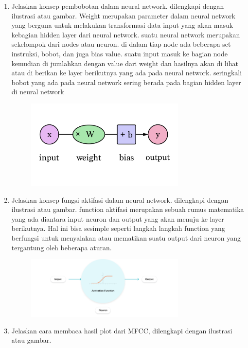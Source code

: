 \begin{enumerate}
\begin{figure}[H]
		\centering
	\end{figure}
	\item Jelaskan konsep pembobotan dalam neural network. dilengkapi dengan ilustrasi atau gambar.
	\hfill\break
	Weight merupakan parameter dalam neural network yang berguna untuk melakukan transformasi data input yang akan masuk kebagian hidden layer dari neural network. suatu neural network merupakan sekelompok dari nodes atau neuron. di dalam tiap node ada beberapa set instruksi, bobot, dan juga bias value. suatu input masuk ke bagian node kemudian di jumlahkan dengan value dari weight dan hasilnya akan di lihat atau di berikan ke layer berikutnya yang ada pada neural network. seringkali bobot yang ada pada neural network sering berada pada bagian hidden layer di neural network
	\begin{figure}[H]
		\includegraphics[width=8cm]{figures/1174071/6/weight.png}
		\centering
	\end{figure}
	\item Jelaskan konsep fungsi aktifasi dalam neural network.  dilengkapi dengan ilustrasi atau gambar.
	\hfill\break
	function aktifasi merupakan sebuah rumus matematika yang ada diantara input neuron dan output yang akan menuju ke layer berikutnya. Hal ini bisa sesimple seperti langkah langkah function yang  berfungsi untuk menyalakan atau mematikan suatu output dari neuron yang tergantung oleh beberapa aturan.
	\begin{figure}[H]
		\includegraphics[width=8cm]{figures/1174071/6/aktifasi.png}
		\centering
	\end{figure}
	\item Jelaskan cara membaca hasil plot dari MFCC, dilengkapi dengan ilustrasi atau gambar.
	\hfill\break
	\begin{figure}[H]

\end{figure}
\end{enumerate}
